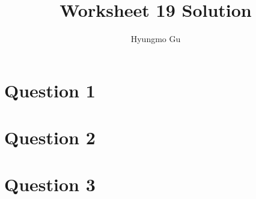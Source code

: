 \documentclass[12pt]{article}
\begin{document}
\title{Worksheet 19 Solution}
\author{Hyungmo Gu}
\maketitle

\section*{Question 1}

\section*{Question 2}

\section*{Question 3}
\end{document}
